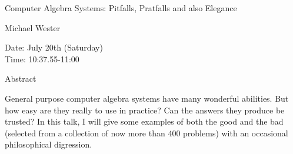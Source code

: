 \begin{center}
\LARGE
Computer Algebra Systems: Pitfalls, Pratfalls and also
                            Elegance 

\end{center}

\begin{center}
\Large
Michael Wester

\end{center}

\noindent
Date:  July 20th (Saturday)\\
Time:  10:37.55-11:00\\

\begin{center}
\large
Abstract
\end{center}

General purpose computer algebra systems have many wonderful abilities. But how easy are they
really to use in practice? Can the answers they produce be trusted? In this talk, I will give some
examples of both the good and the bad (selected from a collection of now more than 400 problems)
with an occasional philosophical digression. 

